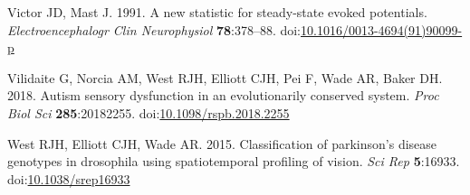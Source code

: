 \documentclass[]{article}
\begin{document}
\leavevmode\hypertarget{ref-Victor1991}{}%
Victor JD, Mast J. 1991. A new statistic for steady-state evoked potentials. \emph{Electroencephalogr Clin Neurophysiol} \textbf{78}:378--88. doi:\href{https://doi.org/10.1016/0013-4694(91)90099-p}{10.1016/0013-4694(91)90099-p}

\leavevmode\hypertarget{ref-Vilidaite2018}{}%
Vilidaite G, Norcia AM, West RJH, Elliott CJH, Pei F, Wade AR, Baker DH. 2018. Autism sensory dysfunction in an evolutionarily conserved system. \emph{Proc Biol Sci} \textbf{285}:20182255. doi:\href{https://doi.org/10.1098/rspb.2018.2255}{10.1098/rspb.2018.2255}

\leavevmode\hypertarget{ref-West2015}{}%
West RJH, Elliott CJH, Wade AR. 2015. Classification of parkinson's disease genotypes in drosophila using spatiotemporal profiling of vision. \emph{Sci Rep} \textbf{5}:16933. doi:\href{https://doi.org/10.1038/srep16933}{10.1038/srep16933}
\end{document}
